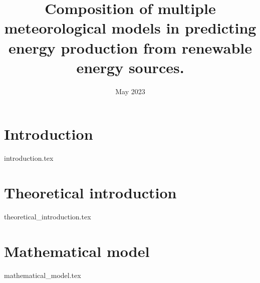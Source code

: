 \documentclass[en]{pracamgr}
\title{Composition of multiple 
meteorological models in predicting energy 
production from renewable energy sources.}
\date{May 2023}
\begin{document}
\maketitle

\begin{abstract}
    
\end{abstract}

\tableofcontents

\chapter{Introduction}
{introduction.tex}

\chapter{Theoretical introduction}
{theoretical_introduction.tex}

\chapter{Mathematical model}
{mathematical_model.tex}

\printbibliography
\end{document}
